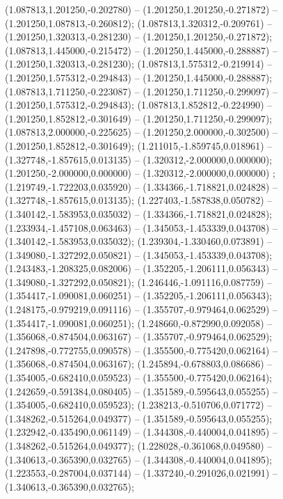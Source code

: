  (1.087813,1.201250,-0.202780) -- (1.201250,1.201250,-0.271872) -- (1.201250,1.087813,-0.260812);
 (1.087813,1.320312,-0.209761) -- (1.201250,1.320313,-0.281230) -- (1.201250,1.201250,-0.271872);
 (1.087813,1.445000,-0.215472) -- (1.201250,1.445000,-0.288887) -- (1.201250,1.320313,-0.281230);
 (1.087813,1.575312,-0.219914) -- (1.201250,1.575312,-0.294843) -- (1.201250,1.445000,-0.288887);
 (1.087813,1.711250,-0.223087) -- (1.201250,1.711250,-0.299097) -- (1.201250,1.575312,-0.294843);
 (1.087813,1.852812,-0.224990) -- (1.201250,1.852812,-0.301649) -- (1.201250,1.711250,-0.299097);
 (1.087813,2.000000,-0.225625) -- (1.201250,2.000000,-0.302500) -- (1.201250,1.852812,-0.301649);
 (1.211015,-1.859745,0.018961) -- (1.327748,-1.857615,0.013135) -- (1.320312,-2.000000,0.000000);
 (1.201250,-2.000000,0.000000) -- (1.320312,-2.000000,0.000000) ;
 (1.219749,-1.722203,0.035920) -- (1.334366,-1.718821,0.024828) -- (1.327748,-1.857615,0.013135);
 (1.227403,-1.587838,0.050782) -- (1.340142,-1.583953,0.035032) -- (1.334366,-1.718821,0.024828);
 (1.233934,-1.457108,0.063463) -- (1.345053,-1.453339,0.043708) -- (1.340142,-1.583953,0.035032);
 (1.239304,-1.330460,0.073891) -- (1.349080,-1.327292,0.050821) -- (1.345053,-1.453339,0.043708);
 (1.243483,-1.208325,0.082006) -- (1.352205,-1.206111,0.056343) -- (1.349080,-1.327292,0.050821);
 (1.246446,-1.091116,0.087759) -- (1.354417,-1.090081,0.060251) -- (1.352205,-1.206111,0.056343);
 (1.248175,-0.979219,0.091116) -- (1.355707,-0.979464,0.062529) -- (1.354417,-1.090081,0.060251);
 (1.248660,-0.872990,0.092058) -- (1.356068,-0.874504,0.063167) -- (1.355707,-0.979464,0.062529);
 (1.247898,-0.772755,0.090578) -- (1.355500,-0.775420,0.062164) -- (1.356068,-0.874504,0.063167);
 (1.245894,-0.678803,0.086686) -- (1.354005,-0.682410,0.059523) -- (1.355500,-0.775420,0.062164);
 (1.242659,-0.591384,0.080405) -- (1.351589,-0.595643,0.055255) -- (1.354005,-0.682410,0.059523);
 (1.238213,-0.510706,0.071772) -- (1.348262,-0.515264,0.049377) -- (1.351589,-0.595643,0.055255);
 (1.232942,-0.435490,0.061149) -- (1.344308,-0.440004,0.041895) -- (1.348262,-0.515264,0.049377);
 (1.228028,-0.361068,0.049580) -- (1.340613,-0.365390,0.032765) -- (1.344308,-0.440004,0.041895);
 (1.223553,-0.287004,0.037144) -- (1.337240,-0.291026,0.021991) -- (1.340613,-0.365390,0.032765);

